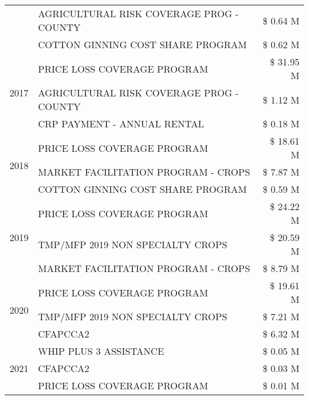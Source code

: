 \begin{tabular}{llr}
 & AGRICULTURAL RISK COVERAGE PROG - COUNTY      & \$ 0.64 M \\
 & COTTON GINNING COST SHARE PROGRAM             & \$ 0.62 M \\
\cline{1-3}
\multirow[t]{3}{*}{2017} & PRICE LOSS COVERAGE PROGRAM & \$ 31.95 M \\
 & AGRICULTURAL RISK COVERAGE PROG - COUNTY & \$ 1.12 M \\
 & CRP PAYMENT - ANNUAL RENTAL & \$ 0.18 M \\
\cline{1-3}
\multirow[t]{3}{*}{2018} & PRICE LOSS COVERAGE PROGRAM & \$ 18.61 M \\
 & MARKET FACILITATION PROGRAM - CROPS & \$ 7.87 M \\
 & COTTON GINNING COST SHARE PROGRAM & \$ 0.59 M \\
\cline{1-3}
\multirow[t]{3}{*}{2019} & PRICE LOSS COVERAGE PROGRAM & \$ 24.22 M \\
 & TMP/MFP 2019 NON SPECIALTY CROPS & \$ 20.59 M \\
 & MARKET FACILITATION PROGRAM - CROPS & \$ 8.79 M \\
\cline{1-3}
\multirow[t]{3}{*}{2020} & PRICE LOSS COVERAGE PROGRAM & \$ 19.61 M \\
 & TMP/MFP 2019 NON SPECIALTY CROPS & \$ 7.21 M \\
 & CFAPCCA2 & \$ 6.32 M \\
\cline{1-3}
\multirow[t]{3}{*}{2021} & WHIP PLUS 3 ASSISTANCE & \$ 0.05 M \\
 & CFAPCCA2 & \$ 0.03 M \\
 & PRICE LOSS COVERAGE PROGRAM & \$ 0.01 M \\
\cline{1-3}
\bottomrule
\end{tabular}
